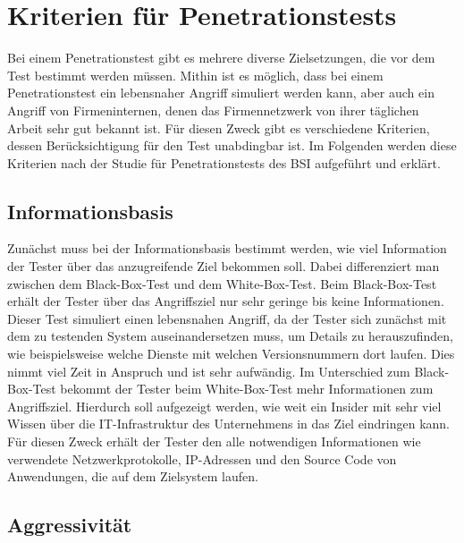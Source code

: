 \section{Kriterien für Penetrationstests}

Bei einem Penetrationstest gibt es mehrere diverse Zielsetzungen, die vor dem Test bestimmt werden müssen. Mithin ist es möglich, dass bei einem Penetrationstest ein lebensnaher Angriff simuliert werden kann, aber auch ein Angriff von Firmeninternen, denen das Firmennetzwerk von ihrer täglichen Arbeit sehr gut bekannt ist. Für diesen Zweck gibt es verschiedene Kriterien, dessen Berücksichtigung für den Test unabdingbar ist. Im Folgenden werden diese Kriterien nach der Studie für Penetrationstests des BSI\cite[13--17]{pt03bsi} aufgeführt und erklärt.

\subsection{Informationsbasis}

Zunächst muss bei der Informationsbasis bestimmt werden, wie viel Information der Tester über das anzugreifende Ziel bekommen soll. Dabei differenziert man zwischen dem Black-Box-Test und dem White-Box-Test. Beim Black-Box-Test erhält der Tester über das Angriffsziel nur sehr geringe bis keine Informationen. Dieser Test simuliert einen lebensnahen Angriff, da der Tester sich zunächst mit dem zu testenden System auseinandersetzen muss, um Details zu herauszufinden, wie beispielsweise welche Dienste mit welchen Versionsnummern
dort laufen. Dies nimmt viel Zeit in Anspruch und ist sehr aufwändig. Im Unterschied zum Black-Box-Test bekommt der Tester beim White-Box-Test mehr Informationen
zum Angriffsziel. Hierdurch soll aufgezeigt werden, wie weit ein Insider mit sehr viel Wissen über die IT-Infrastruktur des Unternehmens in das Ziel eindringen kann. Für diesen Zweck erhält der Tester den alle notwendigen Informationen wie verwendete Netzwerkprotokolle, IP-Adressen und den Source Code von Anwendungen, die auf dem Zielsystem laufen.

\subsection{Aggressivität}


